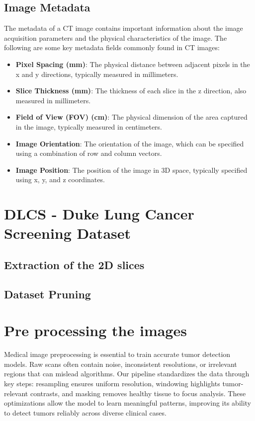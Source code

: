 \subsection{Image Metadata}
The metadata of a CT image contains important information about the image acquisition parameters and the physical characteristics of the image. The following are some key metadata fields commonly found in CT images:
\begin{itemize}
    \item \textbf{Pixel Spacing (mm)}: The physical distance between adjacent pixels in the x and y directions, typically measured in millimeters.
    \item \textbf{Slice Thickness (mm)}: The thickness of each slice in the z direction, also measured in millimeters.
    \item \textbf{Field of View (FOV) (cm)}: The physical dimension of the area captured in the image, typically measured in centimeters.
    \item \textbf{Image Orientation}: The orientation of the image, which can be specified using a combination of row and column vectors.
    \item \textbf{Image Position}: The position of the image in 3D space, typically specified using x, y, and z coordinates.
\end{itemize}



\section{DLCS - Duke Lung Cancer Screening Dataset}
\subsection{Extraction of the 2D slices}
\subsection{Dataset Pruning}

\section{Pre processing the images}
Medical image preprocessing is essential to train accurate tumor detection models. Raw scans often contain noise, inconsistent resolutions, or irrelevant regions that can mislead algorithms. Our pipeline standardizes the data through key steps: resampling ensures uniform resolution, windowing highlights tumor-relevant contrasts, and masking removes healthy tissue to focus analysis. These optimizations allow the model to learn meaningful patterns, improving its ability to detect tumors reliably across diverse clinical cases.
